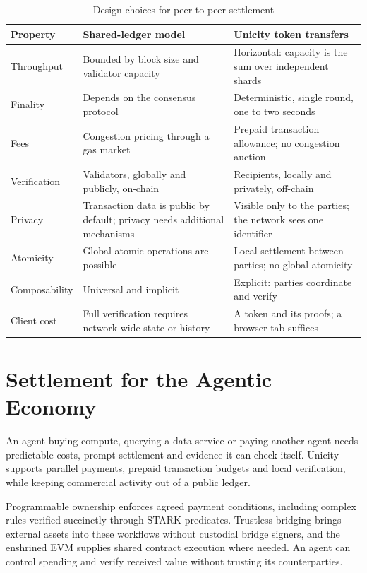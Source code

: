 \begin{table}[htbp]
    \centering
    \caption{Design choices for peer-to-peer settlement}
    \label{tab:compshared}
    \small
    \begin{tabular}{p{2.4cm}p{5.6cm}p{5.6cm}}
        \toprule
        \textbf{Property} & \textbf{Shared-ledger model} & \textbf{Unicity token transfers} \\
        \midrule
        Throughput & Bounded by block size and validator capacity & Horizontal: capacity is the sum over independent shards \\
        \addlinespace
        Finality & Depends on the consensus protocol & Deterministic, single round, one to two seconds \\
        \addlinespace
        Fees & Congestion pricing through a gas market & Prepaid transaction allowance; no congestion auction \\
        \addlinespace
        Verification & Validators, globally and publicly, on-chain & Recipients, locally and privately, off-chain \\
        \addlinespace
        Privacy & Transaction data is public by default; privacy needs additional mechanisms & Visible only to the parties; the network sees one identifier \\
        \addlinespace
        Atomicity & Global atomic operations are possible & Local settlement between parties; no global atomicity \\
        \addlinespace
        Composability & Universal and implicit & Explicit: parties coordinate and verify \\
        \addlinespace
        Client cost & Full verification requires network-wide state or history & A token and its proofs; a browser tab suffices \\
        \bottomrule
    \end{tabular}
\end{table}

\FloatBarrier
\section{Settlement for the Agentic Economy}\label{sec:conclusion}

An agent buying compute, querying a data service or paying another agent needs predictable costs, prompt settlement and evidence it can check itself. Unicity supports parallel payments, prepaid transaction budgets and local verification, while keeping commercial activity out of a public ledger.

Programmable ownership enforces agreed payment conditions, including complex rules verified succinctly through STARK predicates. Trustless bridging brings external assets into these workflows without custodial bridge signers, and the enshrined EVM supplies shared contract execution where needed. An agent can control spending and verify received value without trusting its counterparties.
